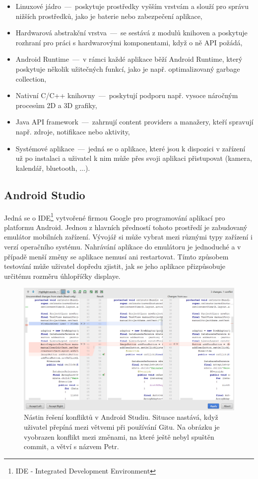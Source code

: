 \begin{itemize}
\item Linuxové jádro \,---\, poskytuje prostředky vyšším vrstvám a slouží pro správu nižších prostředků, jako je baterie nebo zabezpečení aplikace,
\item Hardwarová abstrakční vrstva \,---\, se sestává z modulů knihoven a poskytuje rozhraní pro práci s hardwarovými komponentami, když o ně API požádá,
\item Android Runtime \,---\, v rámci každé aplikace běží Android Runtime, který poskytuje několik užitečných funkcí, jako je např. optimalizovaný garbage collection,
\item Nativní C/C++ knihovny \,---\, poskytují podporu např. vysoce náročným procesům 2D a 3D grafiky,
\item Java API framework \,---\, zahrnují content providers a manažery, kteří spravují např. zdroje, notifikace nebo aktivity,
\item Systémové aplikace \,---\, jedná se o aplikace, které jsou k dispozici v zařízení už po instalaci a uživatel k nim může přes svoji aplikaci přistupovat (kamera, kalendář, bluetooth, ...).
\end{itemize}

\subsection*{Android Studio}
Jedná se o IDE\footnote{IDE - Integrated Development Environment} vytvořené firmou Google pro programování aplikací pro platformu Android. Jednou z hlavních předností tohoto prostředí je zabudovaný emulátor mobilních zařízení. Vývojář si může vybrat mezi různými typy zařízení i verzí operačního systému. Nahrávání aplikace do emulátoru je jednoduché a v případě menší změny se aplikace nemusí ani restartovat. Tímto způsobem testování může uživatel dopředu zjistit, jak se jeho aplikace přizpůsobuje určitému rozměru úhlopříčky displaye. 

\begin{figure}
\centering
\includegraphics[width= 15cm]{obrazky-figures/resolving_conflicts1}
\caption{Nástin řešení konfliktů v Android Studiu. Situace nastává, když uživatel přepíná mezi větvemi při používání Gitu. Na obrázku je vyobrazen konflikt mezi změnami, na které ještě nebyl spuštěn commit, a větví s názvem Petr.}
\label{resolv}
\end{figure}

